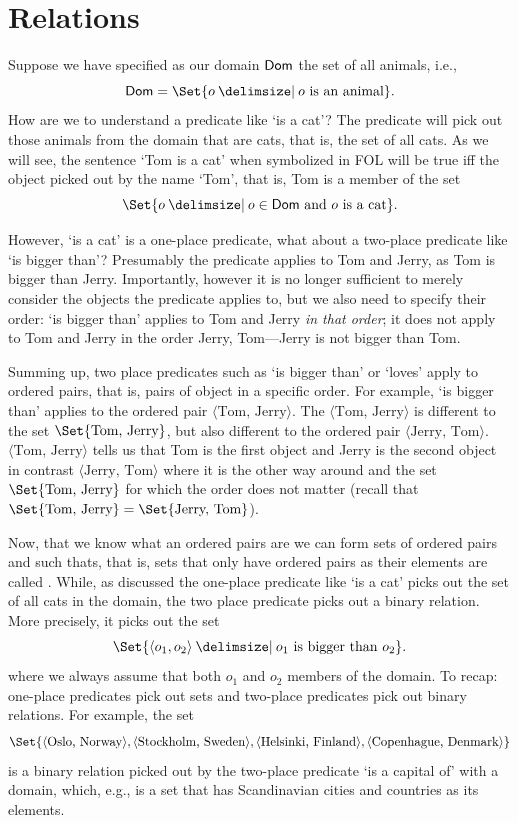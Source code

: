 \section{Relations}\label{sec:Relations}
Suppose we have specified as our domain $\mathsf{Dom}$ the set of all animals, i.e.,
$$\domain=\Set{o \given o\text{ is an animal}}.$$
How are we to understand a predicate like `is a cat'? The predicate will pick out those animals from the domain that are cats, that is, the set of all cats. As we will see, the sentence `Tom is a cat' when symbolized in FOL will be true iff the object picked out by the name `Tom', that is, Tom is a member of the set
$$\Set{o \given o\in \domain\text{ and }o\text{ is a cat}}.$$

However, `is a cat' is a one-place predicate, what about a two-place predicate like `is bigger than'?  Presumably the predicate applies to Tom and Jerry, as Tom is bigger than Jerry. Importantly, however it is no longer sufficient to merely consider the objects the predicate applies to, but we also need to specify their order: `is bigger than' applies to Tom and Jerry \emph{in that order}; it does not apply to Tom and Jerry in the order Jerry, Tom---Jerry is not bigger than Tom. 

Summing up, two place predicates such as `is bigger than' or `loves' apply to ordered pairs, that is, pairs of object in a specific order. For example, `is bigger than' applies to the ordered pair $\langle\text{Tom, Jerry}\rangle$. 
The  $\langle\text{Tom, Jerry}\rangle$ is different to the set $\Set{\text{Tom, Jerry}}$, but also different to the ordered pair $\langle\text{Jerry, Tom}\rangle$. 
$\langle\text{Tom, Jerry}\rangle$ tells us that Tom is the first object and Jerry is the second object in contrast $\langle\text{Jerry, Tom}\rangle$ where it is the other way around and the set 
$\Set{\text{Tom, Jerry}}$ for which the order does not matter (recall that $\Set{\text{Tom, Jerry}}=\Set{\text{Jerry, Tom}}$). 

Now, that we know what an ordered pairs are we can form sets of ordered pairs and such thats, that is, sets that only have ordered pairs as their elements are called . While, as discussed the one-place predicate like `is a cat' picks out the set of all cats in the domain, the two place predicate picks out a binary relation. More precisely, it picks out the set
$$\Set{\langle o_1,o_2\rangle \given o_1\text{ is bigger than }o_2}.$$
where we always assume that both $o_1$ and $o_2$ members of the domain. To recap: one-place predicates pick out sets and two-place predicates pick out binary relations. For example, the set
$${ \Set{\langle\text{Oslo, Norway}\rangle,\langle\text{Stockholm, Sweden}\rangle,\langle\text{Helsinki, Finland}\rangle,\langle\text{Copenhague, Denmark}\rangle}}$$
is a binary relation picked out by the two-place predicate `is a capital of' with a domain, which, e.g., is a set that has Scandinavian cities and countries as its elements.

